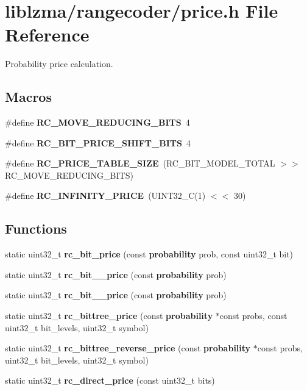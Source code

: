 \section{liblzma/rangecoder/price.h File Reference}
\label{price_8h}


Probability price calculation.  


\subsection*{Macros}
\begin{DoxyCompactItemize}
\item 
\mbox{\label{price_8h_a4d38936a14ae066d7eaa2d801ffa5403}} 
\#define {\bfseries R\+C\+\_\+\+M\+O\+V\+E\+\_\+\+R\+E\+D\+U\+C\+I\+N\+G\+\_\+\+B\+I\+TS}~4
\item 
\mbox{\label{price_8h_af103bd94e53fb3716daae7232e264f25}} 
\#define {\bfseries R\+C\+\_\+\+B\+I\+T\+\_\+\+P\+R\+I\+C\+E\+\_\+\+S\+H\+I\+F\+T\+\_\+\+B\+I\+TS}~4
\item 
\mbox{\label{price_8h_a76af79ce948dc0d68436f2ef0c3eee6c}} 
\#define {\bfseries R\+C\+\_\+\+P\+R\+I\+C\+E\+\_\+\+T\+A\+B\+L\+E\+\_\+\+S\+I\+ZE}~(R\+C\+\_\+\+B\+I\+T\+\_\+\+M\+O\+D\+E\+L\+\_\+\+T\+O\+T\+AL $>$$>$ R\+C\+\_\+\+M\+O\+V\+E\+\_\+\+R\+E\+D\+U\+C\+I\+N\+G\+\_\+\+B\+I\+TS)
\item 
\mbox{\label{price_8h_abb630554054926c3c682496bd6679feb}} 
\#define {\bfseries R\+C\+\_\+\+I\+N\+F\+I\+N\+I\+T\+Y\+\_\+\+P\+R\+I\+CE}~(U\+I\+N\+T32\+\_\+C(1) $<$$<$ 30)
\end{DoxyCompactItemize}
\subsection*{Functions}
\begin{DoxyCompactItemize}
\item 
\mbox{\label{price_8h_a31730e694ca6966ca15e74a297ca2ef1}} 
static uint32\+\_\+t {\bfseries rc\+\_\+bit\+\_\+price} (const \textbf{ probability} prob, const uint32\+\_\+t bit)
\item 
\mbox{\label{price_8h_aa7d8f51846076b5a310edfd2de431c03}} 
static uint32\+\_\+t {\bfseries rc\+\_\+bit\+\_\+\_\+price} (const \textbf{ probability} prob)
\item 
\mbox{\label{price_8h_ab1d9ec6e6e4fd2d1ee018e2fff39e665}} 
static uint32\+\_\+t {\bfseries rc\+\_\+bit\+\_\+\_\+price} (const \textbf{ probability} prob)
\item 
\mbox{\label{price_8h_a5157fa388a830caeb7451cf7d7e11d07}} 
static uint32\+\_\+t {\bfseries rc\+\_\+bittree\+\_\+price} (const \textbf{ probability} $\ast$const probs, const uint32\+\_\+t bit\+\_\+levels, uint32\+\_\+t symbol)
\item 
\mbox{\label{price_8h_a7b8971dfba6f48c072b507a3e5a580fa}} 
static uint32\+\_\+t {\bfseries rc\+\_\+bittree\+\_\+reverse\+\_\+price} (const \textbf{ probability} $\ast$const probs, uint32\+\_\+t bit\+\_\+levels, uint32\+\_\+t symbol)
\item 
\mbox{\label{price_8h_ae1dc528c9c6a82bbd07adfa94b5710ee}} 
static uint32\+\_\+t {\bfseries rc\+\_\+direct\+\_\+price} (const uint32\+\_\+t bits)
\end{DoxyCompactItemize}
